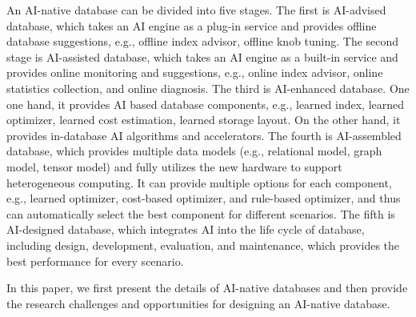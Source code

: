 An AI-native database can be divided into five stages. The first is AI-advised database, which takes an AI engine as a plug-in service and provides offline database suggestions, e.g., offline index advisor, offline knob tuning. The second stage is AI-assisted database, which takes an AI engine as a built-in service and provides online monitoring and suggestions, e.g., online index advisor, online statistics collection, and online diagnosis. The third is AI-enhanced database. One one hand, it provides AI based database components, e.g., learned index, learned optimizer, learned cost estimation, learned storage layout. On the other hand, it provides in-database AI algorithms and accelerators. The fourth is AI-assembled database, which provides multiple data models (e.g., relational model, graph model, tensor model) and fully utilizes the new hardware to support heterogeneous computing. It can provide multiple options for each component, e.g., learned optimizer, cost-based optimizer, and rule-based optimizer, and thus can automatically select the best component for different scenarios. The fifth is AI-designed database, which integrates AI into the life cycle of database, including design, development, evaluation, and maintenance, which provides the best performance for every scenario. 


In this paper, we first present the details of AI-native databases and then provide the research challenges and opportunities for designing an AI-native database. 











